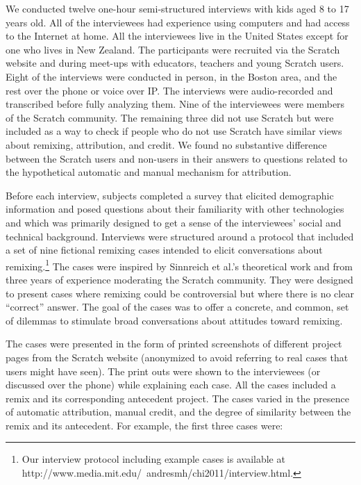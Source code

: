 We conducted twelve one-hour semi-structured interviews with kids aged
8 to 17 years old. All of the interviewees had 
experience using
computers and had access to the Internet at home. All the interviewees
live in the United States except for one who lives in New Zealand. The
participants were recruited via the Scratch website and during
meet-ups with educators, teachers and young Scratch users. Eight of
the interviews were conducted in person, in the Boston area, and the
rest over the phone or voice over IP.  The interviews were
audio-recorded and transcribed before fully analyzing them. Nine of
the interviewees were members of the Scratch community.  The remaining
three did not use Scratch but were included as a way to check if
people who do not use Scratch have similar views about remixing,
attribution, and credit. We found no substantive difference between
the Scratch users and non-users in their answers to questions related
to the hypothetical automatic and manual mechanism for attribution.

Before each interview, subjects completed a survey that elicited
demographic information and posed questions about their familiarity
with other technologies and which was primarily designed to get a
sense of the interviewees' social and technical background. Interviews
were structured around a protocol that included a set of nine
fictional remixing cases intended to elicit conversations about
remixing.\footnote{Our interview protocol including example cases is
  available at
  http://www.media.mit.edu/~andresmh/chi2011/interview.html.} The
cases were inspired by Sinnreich et al.'s theoretical work and from
three years of experience moderating the Scratch community. They were
designed to present cases where remixing could be controversial but
where there is no clear ``correct'' answer. The goal of the cases was
to offer a concrete, and common, set of dilemmas to stimulate broad
conversations about attitudes toward remixing.

The cases were presented in the form of printed screenshots of
different project pages from the Scratch website (anonymized to avoid
referring to real cases that users might have seen).
The print outs were shown to the interviewees (or
discussed over the phone) while explaining each case.  All the cases
included a remix and its corresponding antecedent project. The cases varied 
in the presence of automatic attribution, manual credit, and
the degree of similarity between the remix and its antecedent. For example, the
first three cases were:

